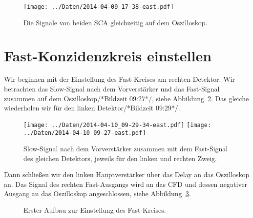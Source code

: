 \begin{figure}[htbp]
    \centering
    \texttt{[image: ../Daten/2014-04-09\_17-38-east.pdf]}
    \hfill
    \caption{%
        Die Signale von beiden SCA gleichzeitig auf dem Oszilloskop.
    }
    \label{fig:beide_sca}
\end{figure}

\section{Fast-Konzidenzkreis einstellen}

Wir beginnen mit der Einstellung des Fast-Kreises am rechten Detektor. Wir
betrachten das Slow-Signal nach dem Vorverstärker und das Fast-Signal zusammen
auf dem Oszilloskop/*Bildzeit 09:27*/, siehe
Abbildung~\ref{fig:fast_einstellen}. Das gleiche wiederholen wir für den linken
Detektor/*Bildzeit 09:29*/.

\begin{figure}[htbp]
    \centering
    \texttt{[image: ../Daten/2014-04-10\_09-29-34-east.pdf]}
    \hfill
    \texttt{[image: ../Daten/2014-04-10\_09-27-east.pdf]}
    \caption{%
        Slow-Signal nach dem Vorverstärker zusammen mit dem Fast-Signal des
        gleichen Detektors, jeweils für den linken und rechten Zweig.
    }
    \label{fig:fast_einstellen}
\end{figure}

Dann schließen wir den linken Hauptverstärker über das Delay an das Oszilloskop
an. Das Signal des rechten Fast-Ausgangs wird an das CFD und dessen negativer
Ausgang an das Oszilloskop angeschlossen, siehe
Abbildung~\ref{fig:aufbau:fast1}.

\begin{figure}[htbp]
    \centering
    \caption{%
        Erster Aufbau zur Einstellung des Fast-Kreises.
    }
    \label{fig:aufbau:fast1}
\end{figure}

